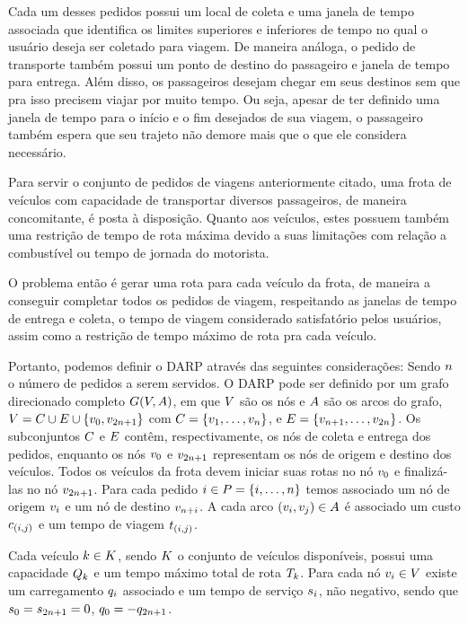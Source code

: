 Cada um desses pedidos possui um local de coleta e uma janela de
tempo associada que identifica os limites superiores e inferiores de tempo no 
qual o usuário deseja ser coletado para viagem.
De maneira análoga, o pedido de transporte também possui um ponto de destino do
passageiro e janela de tempo para entrega.
Além disso, os passageiros desejam chegar em seus destinos sem que pra isso
precisem viajar por muito tempo.
Ou seja, apesar de ter definido uma janela de tempo para o início e o fim
desejados de sua viagem, o passageiro também espera que seu trajeto não demore
mais que o que ele considera necessário.

Para servir o conjunto de pedidos de viagens anteriormente citado, uma frota de
veículos com capacidade de transportar diversos passageiros, de maneira
concomitante, é posta à disposição.
Quanto aos veículos, estes possuem também uma restrição de tempo de rota máxima
devido a suas limitações com relação a combustível ou tempo de jornada do
motorista.

O problema então é gerar uma rota para cada veículo da frota, de maneira a
conseguir completar todos os pedidos de viagem, respeitando as janelas de tempo
de entrega e coleta, o tempo de viagem considerado satisfatório
pelos usuários, assim como a restrição de tempo máximo de rota pra cada
veículo.

Portanto, podemos definir o DARP através das seguintes considerações:
Sendo $n$ o número de pedidos a serem servidos.
O DARP pode ser definido por um grafo direcionado completo 
$G(V,A)$, em que $V$ são os nós e $A$ são os arcos do
grafo, 
$V = C \cup E \cup \{v_{0}, v_{2n + 1} \}$ com
$C = \{v_{1}, \ldots, v_{n}\}$, e 
$E = \{v_{n + 1}, \ldots,
v_{2n}\}$.
Os subconjuntos $C$ e $E$ contêm, respectivamente, 
os nós de coleta e entrega dos pedidos, enquanto os nós $v_{0}$ e 
$v_{2n + 1}$ representam os nós de origem e destino dos veículos.
Todos os veículos da frota devem iniciar suas rotas no nó $v_{0}$ e
finalizá-las no nó $v_{2n + 1}$.
Para cada pedido $i \in P = \{i, \ldots,
n\}$ temos associado um nó de origem $v_{i}$ e um 
nó de destino $v_{n + i}$.
A cada arco $(v_{i},v_{j}) \in A$ é associado um custo $c_{(i,j)}$ 
e um tempo de viagem $t_{(i,j)}$.

Cada veículo $k \in K$, sendo $K$ o conjunto de 
veículos disponíveis, possui uma capacidade $Q_{k}$ e um tempo 
máximo total de rota $T_k$.
Para cada nó $v_{i} \in V$ existe um carregamento $q_{i}$ 
associado e um tempo de serviço $s_{i}$, não negativo, sendo que 
$s_{0} = s_{2n + 1} = 0$, 
$q_{0} = -q_{2n + 1}$. 

